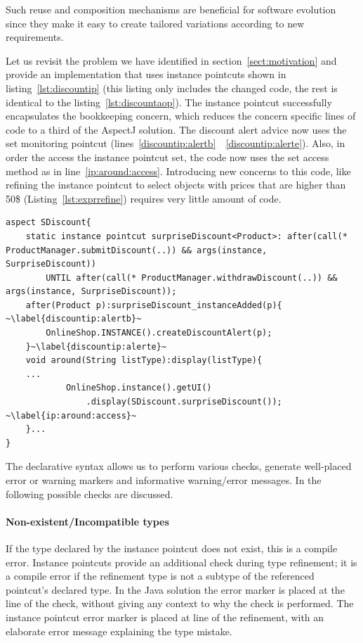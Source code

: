 Such reuse and composition mechanisms are beneficial for software evolution since they make it easy to create tailored variations according to new requirements.

Let us revisit the problem we have identified in section~\ref{sect:motivation} and provide an implementation that uses instance pointcuts shown in listing~\ref{lst:discountip} (this listing only includes the changed code, the rest is identical to the listing~\ref{lst:discountaop}). The instance pointcut  successfully encapsulates the bookkeeping concern, which reduces the concern specific lines of code to a third of the AspectJ solution. The discount alert advice now uses the  set monitoring pointcut (lines~\ref{discountip:alertb}~\textendash~\ref{discountip:alerte}). Also, in order the access the instance pointcut set, the code now uses the set access method as in line~\ref{ip:around:access}. Introducing new concerns to this code, like refining the  instance pointcut to select objects with prices that are higher than 50\$ (Listing~\ref{lst:exprrefine}) requires very little amount of code.   

\begin{lstlisting}[float=h, moreemph=instance, caption={The instance pointcut implementation of the discount alert concern}, label={lst:discountip}]
aspect SDiscount{
	static instance pointcut surpriseDiscount<Product>: after(call(* ProductManager.submitDiscount(..)) && args(instance, SurpriseDiscount)) 
		UNTIL after(call(* ProductManager.withdrawDiscount(..)) && args(instance, SurpriseDiscount));
	after(Product p):surpriseDiscount_instanceAdded(p){ ~\label{discountip:alertb}~
		OnlineShop.INSTANCE().createDiscountAlert(p);
	}~\label{discountip:alerte}~
	void around(String listType):display(listType){
	...
			OnlineShop.instance().getUI()
				.display(SDiscount.surpriseDiscount()); ~\label{ip:around:access}~
	}... 
}
\end{lstlisting}

The declarative syntax allows us to perform various checks, generate well-placed error or warning markers and informative warning/error messages. In the following possible checks are discussed. 

\paragraph*{Non-existent/Incompatible types} If the type declared by the instance pointcut does not exist, this is a compile error. Instance pointcuts provide an additional check during type refinement; it is a compile error if the refinement type is not a subtype of the referenced pointcut's declared type. In the Java solution the error marker is placed at the line of the  check, without giving any context to why the  check is performed. The instance pointcut error marker is placed at line of the refinement, with an elaborate error message explaining the type mistake. 

